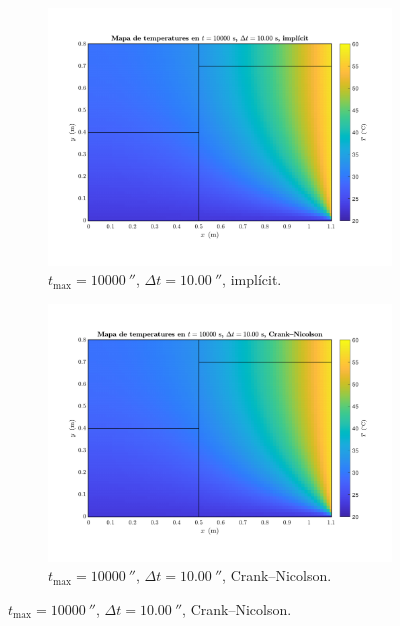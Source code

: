 \begin{figure}[ht]
	\centering
	\begin{subfigure}{.5\textwidth}
		\centering
		\includegraphics[width=.95\linewidth]{imagenes/04_analisi_influencia_dades_numeriques/esquema/esquema_7.pdf}
		\vspace{-15pt}
		\caption{$t_\text{max} = 10000 \ \second$, $\Delta t = 10.00 \ \second$, implícit.}
		\label{fig:esquema_7}
	\end{subfigure}%
	\begin{subfigure}{.5\textwidth}
		\centering
		\includegraphics[width=.95\linewidth]{imagenes/04_analisi_influencia_dades_numeriques/esquema/esquema_8.pdf}
		\vspace{-15pt}
		\caption{$t_\text{max} = 10000 \ \second$, $\Delta t = 10.00 \ \second$, Crank--Nicolson.}

\end{subfigure}
\end{figure}
